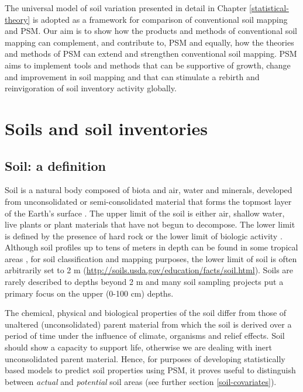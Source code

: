 \documentclass[graybox,natbib,nospthms,UStrade]{svmono}
\begin{document}
The universal model of soil variation presented in detail in
Chapter \ref{statistical-theory} is adopted as a framework for comparison of
conventional soil mapping and PSM. Our aim is to show how the products
and methods of conventional soil mapping can complement, and contribute to,
PSM and equally, how the theories and methods of
PSM can extend and strengthen conventional soil mapping.
PSM aims to implement tools and methods that can be supportive of
growth, change and improvement in soil mapping and that can stimulate a
rebirth and reinvigoration of soil inventory activity globally.

\hypertarget{soils-and-soil-inventories}{%
\section{Soils and soil inventories}\label{soils-and-soil-inventories}}

\hypertarget{soil-a-definition}{%
\subsection{Soil: a definition}\label{soil-a-definition}}

Soil is a natural body composed of biota and air, water and minerals,
developed from unconsolidated or semi-consolidated material that forms the
topmost layer of the Earth's surface \citep{chesworth2008encyclopedia}. The
upper limit of the soil is either air, shallow water, live plants or
plant materials that have not begun to decompose. The lower limit is
defined by the presence of hard rock or the lower limit of biologic
activity \citep{Richter1995, SSDS1993}. Although soil profiles up to tens
of meters in depth can be found in some tropical areas \citep{Richter1995}, for
soil classification and mapping purposes, the lower limit of soil is often
arbitrarily set to 2 m (\url{http://soils.usda.gov/education/facts/soil.html}). Soils are rarely described to depths beyond 2 m and
many soil sampling projects put a primary focus on the upper
(0-100 cm) depths.

The chemical, physical and biological properties of the soil differ from
those of unaltered (unconsolidated) parent material from which the soil
is derived over a period of time under the influence of climate, organisms
and relief effects. Soil should show a capacity to support life,
otherwise we are dealing with inert unconsolidated parent material. Hence, for
purposes of developing statistically based models to predict soil
properties using PSM, it proves useful to distinguish between \emph{actual}
and \emph{potential} soil areas (see further section \ref{soil-covariates}).
\end{document}

